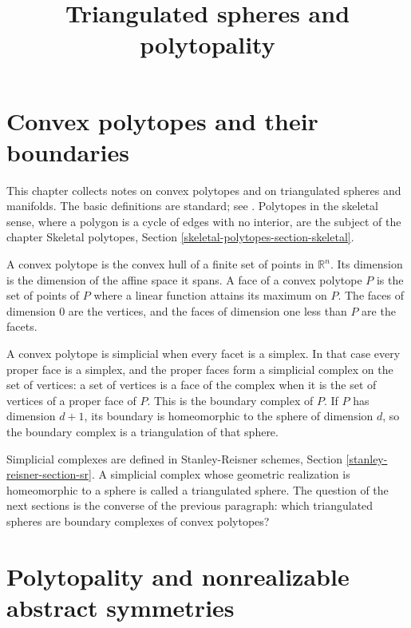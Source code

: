 



\title{Triangulated spheres and polytopality}
\maketitle

\label{section-phantom}

\tableofcontents

\section{Convex polytopes and their
boundaries}
\label{section-convex-polytopes}

\noindent
This chapter collects notes on convex
polytopes and on triangulated spheres and
manifolds. The basic definitions are
standard; see \cite{ziegler-polytopes}.
Polytopes in the skeletal sense, where a
polygon is a cycle of edges with no interior,
are the subject of the chapter Skeletal
polytopes, Section
\ref{skeletal-polytopes-section-skeletal}.

A convex polytope is the convex hull of a
finite set of points in $\mathbb{R}^n$. Its
dimension is the dimension of the affine
space it spans. A face of a convex polytope
$P$ is the set of points of $P$ where a
linear function attains its maximum on $P$.
The faces of dimension $0$ are the vertices,
and the faces of dimension one less than $P$
are the facets.

A convex polytope is simplicial when every
facet is a simplex. In that case every proper
face is a simplex, and the proper faces form
a simplicial complex on the set of vertices:
a set of vertices is a face of the complex
when it is the set of vertices of a proper
face of $P$. This is the boundary complex of
$P$. If $P$ has dimension $d+1$, its boundary
is homeomorphic to the sphere of dimension
$d$, so the boundary complex is a
triangulation of that sphere.

Simplicial complexes are defined in
Stanley-Reisner schemes, Section
\ref{stanley-reisner-section-sr}. A
simplicial complex whose geometric
realization is homeomorphic to a sphere is
called a triangulated sphere. The question of
the next sections is the converse of the
previous paragraph: which triangulated
spheres are boundary complexes of convex
polytopes?

\section{Polytopality and nonrealizable
abstract symmetries}
\label{section-polytopality-symmetries}

